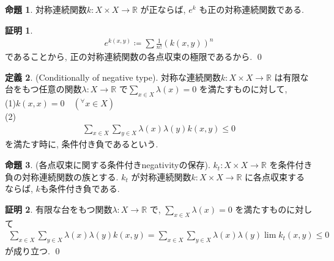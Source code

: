 \documentclass[10pt, fleqn, label-section=none]{bxjsarticle}
\theoremstyle{definition}
\newtheorem{dfn}{定義}[section]
\newtheorem{prop}[dfn]{命題}
\newtheorem*{pf*}{証明}
\newcommand{\any}{{}^{\forall}}
\renewcommand{\;}{\, ; \,}
\begin{document}
\begin{prop}対称連続関数$k : X \times X \rightarrow \mathbb R$ が正ならば, $e^k$ も正の対称連続関数である. 

\end{prop}
\begin{pf*}
\begin{align*} e^{k(x,y)} \coloneqq \sum \frac{1}{n!}(k(x, y))^n  \end{align*}
であることから, 正の対称連続関数の各点収束の極限であるから. 
\qed
\end{pf*}




\begin{dfn}(Conditionally of negative type). 対称な連続関数$k : X \times X \rightarrow \mathbb R$ は有限な台をもつ任意の関数$\lambda : X \rightarrow \mathbb R$ で$\sum_{x \in X} \lambda (x) = 0$ を満たすものに対して, \\
(1)$k(x, x) = 0 \quad (\any x \in X)$ \\
(2)
\begin{align*} \sum_{x \in X}\sum_{y \in X} \lambda(x) \lambda (y) k(x, y) \leq 0  \end{align*}
を満たす時に, 条件付き負であるという. 
\end{dfn}

\begin{prop}(各点収束に関する条件付きnegativityの保存). $k_t : X \times X \rightarrow \mathbb R$ を条件付き負の対称連続関数の族とする. $k_t$ が対称連続関数$k: X \times X \rightarrow \mathbb R$ に各点収束するならば, $k$も条件付き負である. 

\end{prop}
\begin{pf*}有限な台をもつ関数$\lambda : X \rightarrow \mathbb R$ で, $\sum_{x \in X} \lambda(x) = 0$ を満たすものに対して
\begin{align*}  \sum_{x \in X}\sum_{y \in X} \lambda(x) \lambda(y) k(x, y) =  \sum_{x \in X}\sum_{y \in X} \lambda(x) \lambda(y) \lim k_t(x, y) \leq  0  \end{align*}
が成り立つ. 
\qed
\end{pf*}
\end{document}
